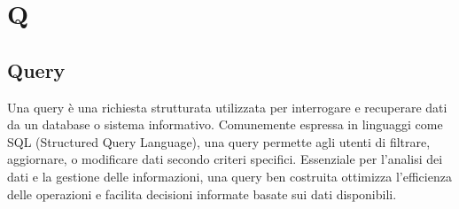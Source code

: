 \section{Q}
\vspace{2em}
\subsection*{Query}
Una query è una richiesta strutturata utilizzata per interrogare e recuperare dati da un database o sistema informativo. Comunemente espressa in linguaggi come SQL (Structured Query Language), una query permette agli utenti di filtrare, aggiornare, o modificare dati secondo criteri specifici. Essenziale per l'analisi dei dati e la gestione delle informazioni, una query ben costruita ottimizza l'efficienza delle operazioni e facilita decisioni informate basate sui dati disponibili.
